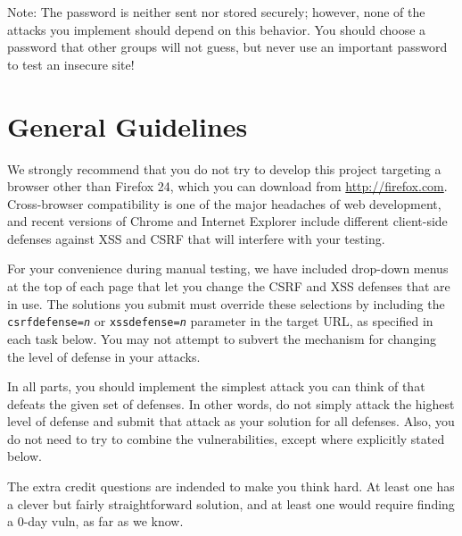 \documentclass[letterpaper,12pt]{article}
\begin{document}
{\begin{description}
{Note: The password is neither sent nor stored securely; however, none of the attacks you implement should depend on this behavior.  You should choose a password that other groups will not guess, but never use an important password to test an insecure site!}

\end{description}


\section*{General Guidelines}


We strongly recommend that you do not try to develop this project targeting a browser other than Firefox 24, which you can download from \url{http://firefox.com}.  Cross-browser compatibility is one of the major headaches of web development, and recent versions of Chrome and Internet Explorer include different client-side defenses against XSS and CSRF that will interfere with your testing.

\medskip

For your convenience during manual testing, we have included drop-down menus at the top of each page that let you change the CSRF and XSS defenses that are in use.  The solutions you submit must override these selections by including the \texttt{csrfdefense=\emph{n}} or \texttt{xssdefense=\emph{n}} parameter in the target URL, as specified in each task below.  You may not attempt to subvert the mechanism for changing the level of defense in your attacks.

\medskip

In all parts, you should implement the simplest attack you can think of that defeats the given set of defenses. In other words, do not simply attack the highest level of defense and submit that attack as your solution for all defenses. Also, you do not need to try to combine the vulnerabilities, except where explicitly stated below.

\medskip

The extra credit questions are indended to make you think hard.  At least one has a clever but fairly straightforward solution, and at least one would require finding a 0-day vuln, as far as we know.

}
\end{document}
